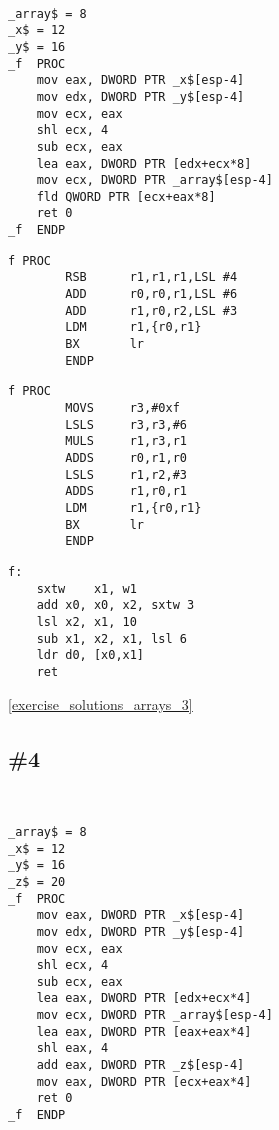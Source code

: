 \WhatThisCodeDoes\


\begin{lstlisting}[caption=\Optimizing MSVC 2010]
_array$ = 8
_x$ = 12
_y$ = 16
_f	PROC
	mov	eax, DWORD PTR _x$[esp-4]
	mov	edx, DWORD PTR _y$[esp-4]
	mov	ecx, eax
	shl	ecx, 4
	sub	ecx, eax
	lea	eax, DWORD PTR [edx+ecx*8]
	mov	ecx, DWORD PTR _array$[esp-4]
	fld	QWORD PTR [ecx+eax*8]
	ret	0
_f	ENDP
\end{lstlisting}

\begin{lstlisting}[caption=\NonOptimizingKeilVI (\ARMMode)]
f PROC
        RSB      r1,r1,r1,LSL #4
        ADD      r0,r0,r1,LSL #6
        ADD      r1,r0,r2,LSL #3
        LDM      r1,{r0,r1}
        BX       lr
        ENDP
\end{lstlisting}

\begin{lstlisting}[caption=\NonOptimizingKeilVI (\ThumbMode)]
f PROC
        MOVS     r3,#0xf
        LSLS     r3,r3,#6
        MULS     r1,r3,r1
        ADDS     r0,r1,r0
        LSLS     r1,r2,#3
        ADDS     r1,r0,r1
        LDM      r1,{r0,r1}
        BX       lr
        ENDP
\end{lstlisting}

\begin{lstlisting}[caption=\Optimizing GCC 4.9 (ARM64)]
f:
	sxtw	x1, w1
	add	x0, x0, x2, sxtw 3
	lsl	x2, x1, 10
	sub	x1, x2, x1, lsl 6
	ldr	d0, [x0,x1]
	ret
\end{lstlisting}

\Answer\: \ref{exercise_solutions_arrays_3}

\subsection{\Exercise \#4}
\label{exercise_array_4}

\WhatThisCodeDoes\


\begin{lstlisting}[caption=\Optimizing MSVC 2010]
_array$ = 8	
_x$ = 12	
_y$ = 16	
_z$ = 20	
_f	PROC
	mov	eax, DWORD PTR _x$[esp-4]
	mov	edx, DWORD PTR _y$[esp-4]
	mov	ecx, eax
	shl	ecx, 4
	sub	ecx, eax
	lea	eax, DWORD PTR [edx+ecx*4]
	mov	ecx, DWORD PTR _array$[esp-4]
	lea	eax, DWORD PTR [eax+eax*4]
	shl	eax, 4
	add	eax, DWORD PTR _z$[esp-4]
	mov	eax, DWORD PTR [ecx+eax*4]
	ret	0
_f	ENDP
\end{lstlisting}

